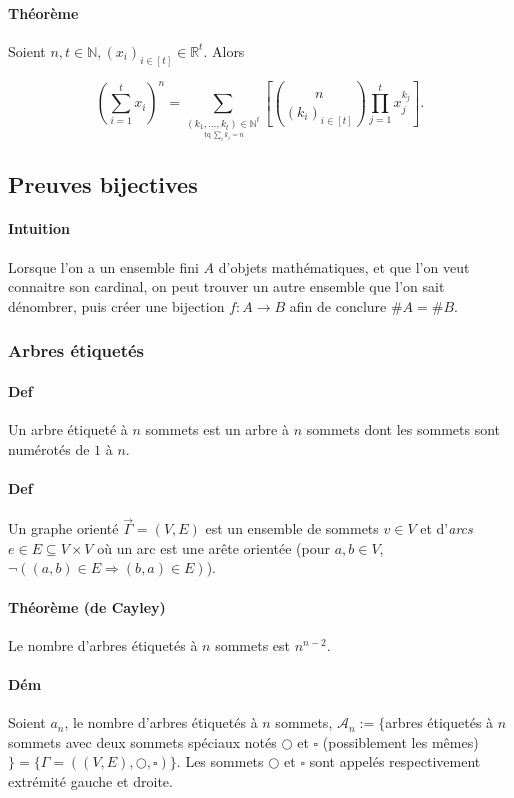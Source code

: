 \documentclass{article}
\DeclareMathOperator{\tq}{\text{ tq }}
\begin{document}
			\paragraph{Théorème} Soient $n, t \in \mathbb N, (x_i)_{i\in[t]} \in \mathbb R^t$. Alors

			\[\left(\sum_{i=1}^tx_i\right)^n
			= \sum_{\underset {\tq \sum_ik_i=n}{(k_1, \ldots, k_t) \in \mathbb N^t}}\left[\binom {n}{(k_i)_{i \in [t]}} \prod_{j=1}^tx_j^{k_j}\right].\]

		\subsection{Preuves bijectives}

			\paragraph{Intuition} Lorsque l'on a un ensemble fini $A$ d'objets mathématiques, et que l'on veut connaitre son cardinal, on peut trouver un autre
			ensemble que l'on sait dénombrer, puis créer une bijection $f : A \to B$ afin de conclure $\#A = \#B$.

			\subsubsection{Arbres étiquetés}

			\paragraph{Def} Un arbre étiqueté à $n$ sommets est un arbre à $n$ sommets dont les sommets sont numérotés de $1$ à $n$.

			\paragraph{Def} Un graphe orienté $\vec {\Gamma}= (V, E)$ est un ensemble de sommets $v \in V$ et d'\textit{arcs} $e \in E \subseteq V \times V$
			où un arc est une arête orientée (pour $a, b \in V$, $\lnot((a, b) \in E \Rightarrow (b, a) \in E)$).

			\paragraph{Théorème (de Cayley)} Le nombre d'arbres étiquetés à $n$ sommets est $n^{n-2}$.

			\paragraph{Dém} Soient $a_n$, le nombre d'arbres étiquetés à $n$ sommets, $\mathcal A_n := \{$arbres étiquetés à $n$ sommets avec deux sommets spéciaux notés
			$\bigcirc$ et $\square$ (possiblement les mêmes)$\} = \{\Gamma = ((V, E), \bigcirc, \square)\}$. Les sommets $\bigcirc$ et $\square$ sont appelés respectivement
			extrémité gauche et droite.
\end{document}
